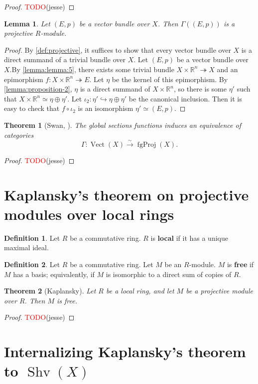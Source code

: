 \documentclass[11pt]{article}
\newcommand{\R}{\mathbb{R}}
\newcommand{\remph}[1]{\textcolor{red}{#1}}
\newcommand{\TODO}{\remph{TODO}}
\newcommand{\Vect}{\operatorname{Vect}}
\newcommand{\fgProj}{\operatorname{fgProj}}
\newcommand{\Shv}{\operatorname{Shv}}
\theoremstyle{plain}
\newtheorem{lemma}{Lemma}[section]
\newtheorem{theorem}{Theorem}[section]
\theoremstyle{definition}
\newtheorem{definition}{Definition}[section]
\begin{document}
\begin{proof}
  \TODO(jesse)
\end{proof}

\begin{lemma}
  \label{lemma:global-sections-projective}
  Let \((E,p)\) be a vector bundle over \(X\). Then \(\Gamma((E,p))\) is a projective \(R\)-module.
\end{lemma}

\begin{proof}
  By \ref{def:projective}, it suffices to show that every vector bundle over \(X\) is a direct summand of a trivial bundle over \(X\). Let \((E,p)\) be a vector bundle over \(X\).By \ref{lemma:lemma:5}, there exists some trivial bundle \(X \times \R^n \twoheadrightarrow X\) and an epimorphism \(f : X \times \R^n \twoheadrightarrow E\). Let \(\eta\) be the kernel of this epimorphism. By \ref{lemma:proposition-2}, \(\eta\) is a direct summand of \(X \times \R^n\), so there is some \(\eta'\) such that \(X \times \R^n \simeq \eta \oplus \eta'\). Let \(\iota_2 : \eta' \hookrightarrow \eta \oplus \eta'\) be the canonical inclusion. Then it is easy to check that \(f \circ \iota_2\) is an isomorphism \(\eta' \simeq (E,p)\).
\end{proof}

\begin{theorem}[Swan, \cite{swan1962vector}] \label{thm:swan}
  The global sections functions induces an equivalence of categories
  \[\Gamma : \Vect(X) \overset{\sim}{\longrightarrow} \fgProj(X).\]
\end{theorem}

\begin{proof}
  \TODO(jesse)
\end{proof}

\section{Kaplansky's theorem on projective modules over local rings}

\begin{definition}\label{def:local-ring}
  Let \(R\) be a commutative ring. \(R\) is \textbf{local} if it has a unique maximal ideal.
\end{definition}

\begin{definition}\label{def:free-module}
  Let \(R\) be a commutative ring. Let \(M\) be an \(R\)-module. \(M\) is \textbf{free} if \(M\) has a basis; equivalently, if \(M\) is isomorphic to a direct sum of copies of \(R\).
\end{definition}

\begin{theorem}[Kaplansky]\label{thm:kaplansky}
  Let \(R\) be a local ring, and let \(M\) be a projective module over \(R\). Then \(M\) is free.
\end{theorem}

\begin{proof}
  \TODO(jesse)
\end{proof}

\section{Internalizing Kaplansky's theorem to \(\Shv(X)\)}


\end{document}
